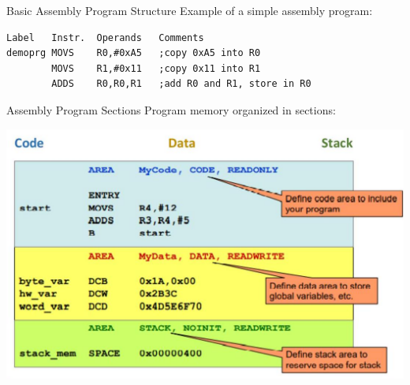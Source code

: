 \begin{code}{Basic Assembly Program Structure}
Example of a simple assembly program:
\begin{lstlisting}[language=armasm, style=basesmol]
Label   Instr.  Operands   Comments
demoprg MOVS    R0,#0xA5   ;copy 0xA5 into R0
        MOVS    R1,#0x11   ;copy 0x11 into R1
        ADDS    R0,R0,R1   ;add R0 and R1, store in R0
\end{lstlisting}
\end{code}

\begin{concept}{Assembly Program Sections}
Program memory organized in sections:

\includegraphics[width=\linewidth]{images/2024_12_29_79e6b22f503fb7b4f718g-02(1)}


\end{concept}
